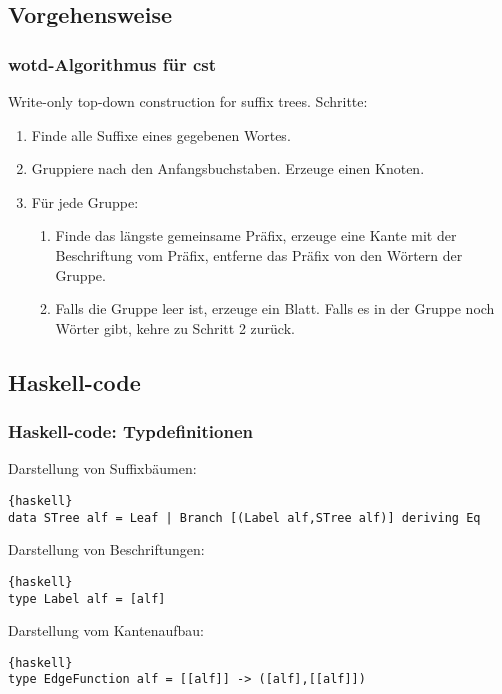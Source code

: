 \documentclass{beamer}
\begin{document}
\subsection{Vorgehensweise}

\begin{frame}[t]
\frametitle{wotd-Algorithmus für cst}
    Write-only top-down construction for suffix trees.
    \medskip
    Schritte:
    \begin{enumerate}
    \item Finde alle Suffixe eines gegebenen Wortes.
    \item Gruppiere nach den Anfangsbuchstaben. Erzeuge einen Knoten.
    \item Für jede Gruppe:
    \begin{enumerate}
    \item Finde das längste gemeinsame Präfix, erzeuge eine Kante mit der Beschriftung vom Präfix, entferne das Präfix von den Wörtern der Gruppe.
    \item Falls die Gruppe leer ist, erzeuge ein Blatt. Falls es in der Gruppe noch Wörter gibt, kehre zu Schritt 2 zurück.
    \end{enumerate}
    \end{enumerate}
\end{frame}


\subsection{Haskell-code}

\begin{frame}[fragile]
\frametitle{Haskell-code: Typdefinitionen}
Darstellung von Suffixbäumen:
\begin{lstlisting}{haskell}
data STree alf = Leaf | Branch [(Label alf,STree alf)] deriving Eq
\end{lstlisting}
\bigskip
Darstellung von Beschriftungen:
\begin{lstlisting}{haskell}
type Label alf = [alf]
\end{lstlisting}
\bigskip
Darstellung vom Kantenaufbau:
\begin{lstlisting}{haskell}
type EdgeFunction alf = [[alf]] -> ([alf],[[alf]])
\end{lstlisting}
\end{frame}
\end{document}
